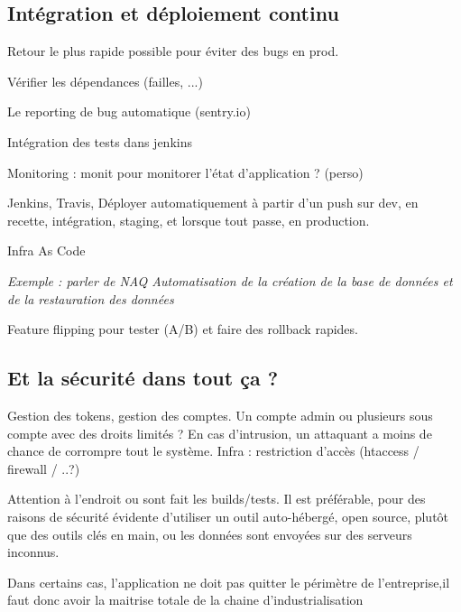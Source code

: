 \subsection{Intégration et déploiement continu}


Retour le plus rapide possible pour éviter des bugs en prod. 

Vérifier les dépendances (failles, ...)

Le reporting de bug automatique (sentry.io)

Intégration des tests dans jenkins

Monitoring : monit pour monitorer l'état d'application ? (perso)

Jenkins, Travis, Déployer automatiquement à partir d'un push sur dev, en recette, intégration, staging, et lorsque tout passe, en production.

Infra As Code %

\textit{Exemple : parler de NAQ Automatisation de la création de la base de données et de la restauration des données}

Feature flipping pour tester (A/B) et faire des rollback rapides.

\subsection{Et la sécurité dans tout ça ?}


Gestion des tokens, gestion des comptes.
Un compte admin ou plusieurs sous compte avec des droits limités ? En cas d'intrusion, un attaquant a moins de chance de corrompre tout le système.
Infra : restriction d'accès (htaccess / firewall / ..?)

Attention à l'endroit ou sont fait les builds/tests. Il est préférable, pour des raisons de sécurité évidente d'utiliser un outil auto-hébergé, open source, plutôt que des outils clés en main, ou les données sont envoyées sur des serveurs inconnus. 

Dans certains cas, l'application ne doit pas quitter le périmètre de l'entreprise,il faut donc avoir la maitrise totale de la chaine d'industrialisation
